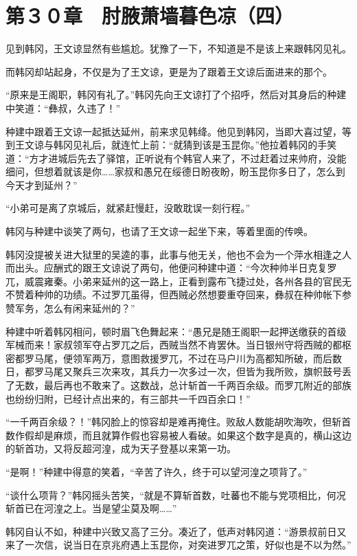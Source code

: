 \section{第３０章　肘腋萧墙暮色凉（四）}

见到韩冈，王文谅显然有些尴尬。犹豫了一下，不知道是不是该上来跟韩冈见礼。

而韩冈却站起身，不仅是为了王文谅，更是为了跟着王文谅后面进来的那个。

“原来是王阁职，韩冈有礼了。”韩冈先向王文谅打了个招呼，然后对其身后的种建中笑道：“彝叔，久违了！”

种建中跟着王文谅一起抵达延州，前来求见韩绛。他见到韩冈，当即大喜过望，等到王文谅与韩冈见礼后，就连忙上前：“就猜到该是玉昆你。”他拉着韩冈的手笑道：“方才进城后先去了驿馆，正听说有个韩官人来了，不过赶着过来帅府，没能细问，但想着就该是你……家叔和愚兄在绥德日盼夜盼，盼玉昆你多日了，怎么到今天才到延州？”

“小弟可是离了京城后，就紧赶慢赶，没敢耽误一刻行程。”

韩冈与种建中谈笑了两句，也请了王文谅一起坐下来，等着里面的传唤。

韩冈没提被关进大狱里的吴逵的事，此事与他无关，他也不会为一个萍水相逢之人而出头。应酬式的跟王文谅说了两句，他便问种建中道：“今次种帅半日克复罗兀，威震雍秦。小弟来延州的这一路上，正看到露布飞捷过处，各州各县的官民无不赞着种帅的功绩。不过罗兀虽得，但西贼必然想要重夺回来，彝叔在种帅帐下参赞军务，怎么有闲来延州的？”

种建中听着韩冈相问，顿时眉飞色舞起来：“愚兄是随王阁职一起押送缴获的首级军械而来！家叔领军夺占罗兀之后，西贼当然不肯罢休。当日银州守将西贼的都枢密都罗马尾，便领军两万，意图救援罗兀，不过在马户川为高都知所破，而后数日，都罗马尾又聚兵三次来攻，其兵力一次多过一次，但皆为我所败，旗帜鼓号丢了无数，最后再也不敢来了。这数战，总计斩首一千两百余级。而罗兀附近的部族也纷纷归附，已经计点出来的，有三部共一千四百余口！”

“一千两百余级？！”韩冈脸上的惊容却是难再掩住。败敌人数能胡吹海吹，但斩首数作假却是麻烦，而且就算作假也容易被人看破。如果这个数字是真的，横山这边的斩首功，又将反超河湟，成为天子登基以来第一功。

“是啊！”种建中得意的笑着，“辛苦了许久，终于可以望河湟之项背了。”

“谈什么项背？”韩冈摇头苦笑，“就是不算斩首数，吐蕃也不能与党项相比，何况斩首已在河湟之上。当是望尘莫及啊……”

韩冈自认不如，种建中兴致又高了三分。凑近了，低声对韩冈道：“游景叔前日又来了一次信，说当日在京兆府遇上玉昆你，对突进罗兀之策，好似也是不以为然。”

